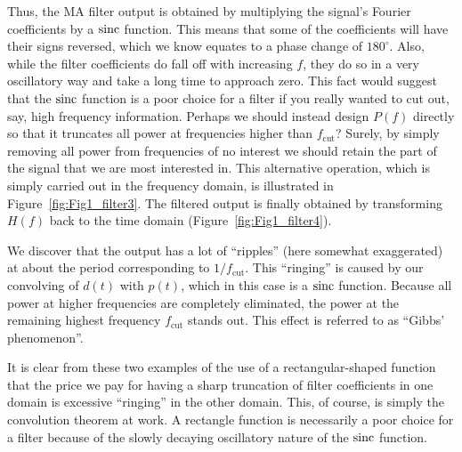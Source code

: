 \noindent
Thus, the MA filter output is obtained by multiplying the signal's Fourier coefficients by a $\operatorname{sinc}$ function.  This 
means that some of the coefficients will have their signs reversed, which we know equates to a 
phase change of $180^{\circ}$.  Also, while the filter coefficients do fall off with increasing $f$, they do so in a very 
oscillatory way and take a long time to approach zero.  This fact would suggest that the $\operatorname{sinc}$ function is a 
poor choice for a filter if you really wanted to cut out, say, high frequency information.  Perhaps we 
should instead design $P(f)$ directly so that it truncates all power at frequencies higher than $f_{\mbox{cut}}$?
Surely, by simply removing all power from frequencies of no interest we should retain the part of the signal
that we are most interested in.
This alternative operation, which is simply carried out in the frequency domain, is illustrated in Figure~\ref{fig:Fig1_filter3}.
The filtered output is finally obtained by transforming $H(f)$ back to the time domain (Figure~\ref{fig:Fig1_filter4}).

We discover that the output has a lot of ``ripples'' (here somewhat exaggerated) at about the period corresponding to $1/f_{\mbox {cut}}$.  
This ``ringing'' is caused by our convolving of $d(t)$ with $p(t)$, which in this case is a $\operatorname{sinc}$ function.  Because all power 
at higher frequencies are completely eliminated, the power at the remaining highest frequency $f_{\mbox{cut}}$
stands out.  This effect is referred to as ``Gibbs' phenomenon''.

	It is clear from these two examples of the use of a rectangular-shaped function that the price we 
pay for having a sharp truncation of filter coefficients in one domain is excessive ``ringing'' in the 
other domain.  This, of course, is simply the convolution theorem at work.  A rectangle function 
is necessarily a poor choice for a filter because of the slowly decaying oscillatory nature of the 
$\operatorname{sinc}$ function.


